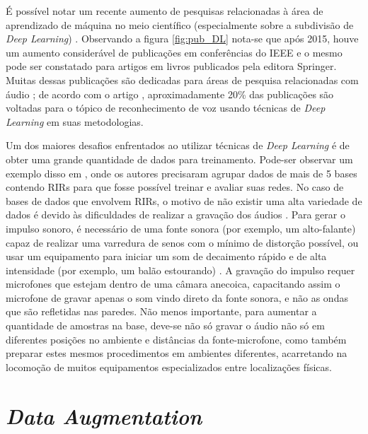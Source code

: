 É possível notar um recente aumento de pesquisas relacionadas à área de aprendizado de máquina no meio científico (especialmente sobre a subdivisão de 
\textit{Deep Learning}) \cite{Study_SR_DL}. Observando a figura \ref{fig:pub_DL} \cite{Jounal_Awareness_DL} nota-se que após 2015, houve um aumento 
considerável de publicações em conferências do IEEE e o mesmo pode ser constatado para artigos em livros publicados pela editora Springer\textregistered.
Muitas dessas publicações são dedicadas para áreas de pesquisa relacionadas com áudio \cite{Study_SR_DL, Speech_proc_plus_DL, Source_Sep_DL}; de acordo com o artigo \cite{Survey_DL}, aproximadamente 20\% 
das publicações são voltadas para o tópico de reconhecimento de voz usando técnicas de \textit{Deep Learning} em suas metodologias.

Um dos maiores desafios enfrentados ao utilizar técnicas de \textit{Deep Learning} é de obter uma grande quantidade de dados para treinamento.
Pode-ser observar um exemplo disso em \cite{Estimation_RT_DRR,ACE_Data_Aug_Eval}, onde os autores precisaram agrupar dados de mais de 5 bases contendo
RIRs para que fosse possível treinar e avaliar suas redes.
No caso de bases de dados que envolvem RIRs, o motivo de não existir uma alta variedade de dados é devido às dificuldades
de realizar a gravação dos áudios \cite{Recording_RIR_2}.
Para gerar o impulso sonoro, é necessário de uma fonte sonora (por exemplo, um alto-falante) capaz de realizar uma varredura de senos com o mínimo de distorção
possível, ou usar um equipamento para iniciar um som de decaimento rápido e de alta intensidade (por exemplo, um balão estourando) \cite{Recording_RIR}.
A gravação do impulso requer microfones que estejam dentro de uma câmara anecoica, capacitando assim o microfone de gravar apenas o som vindo direto
da fonte sonora, e não as ondas que são refletidas nas paredes.
Não menos importante, para aumentar a quantidade de amostras na base, deve-se não só gravar o áudio não só em diferentes posições no ambiente
e distâncias da fonte-microfone, como também preparar estes mesmos procedimentos em ambientes diferentes, acarretando na locomoção de muitos equipamentos
especializados entre localizações físicas.


\section{\textit{Data Augmentation}}

